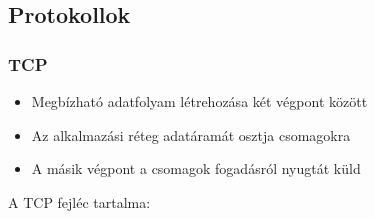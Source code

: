 \documentclass[12pt]{article}
\begin{document}
	\subsection*{Protokollok\\}

	\subsubsection*{TCP}

    \begin{itemize}
        \item Megbízható adatfolyam létrehozása két végpont között
        \item Az alkalmazási réteg adatáramát osztja csomagokra
        \item A másik végpont a csomagok fogadásról nyugtát küld
    \end{itemize}

    \noindent A TCP fejléc tartalma:\\
\end{document}
